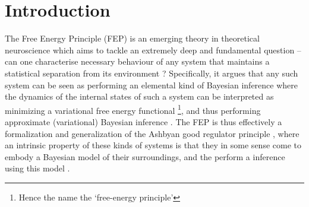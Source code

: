 \chapter{Introduction}
% 
The Free Energy Principle (FEP) \citep{friston2006free,friston2012free,friston2019particularphysics,parr2020markov} is an emerging theory in theoretical neuroscience which aims to tackle an extremely deep and fundamental question -- can one characterise necessary behaviour of any system that maintains a statistical separation from its environment \citep{parr2020markov,friston2019particularphysics,bruineberg2020emperor}? Specifically, it argues that any such system can be seen as performing an elemental kind of Bayesian inference where the dynamics of the internal states of such a system can be interpreted as minimizing a variational free energy functional \citep{beal2003variational} \footnote{Hence the name the `free-energy principle'}, and thus performing approximate (variational) Bayesian inference \citep{friston2019particularphysics}. The FEP is thus effectively a formalization and generalization of the Ashbyan good regulator principle \citep{conant1970every}, where an intrinsic property of these kinds of systems is that they in some sense come to embody a Bayesian model of their surroundings, and the perform a inference using this model \citep{baltieri2020predictions}.

